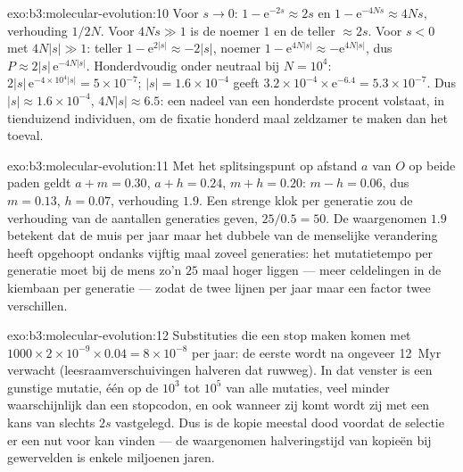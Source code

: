 \begin{solution}{exo:b3:molecular-evolution:10}
Voor $s \to 0$: $1 - \mathrm{e}^{-2s} \approx 2s$ en $1 - \mathrm{e}^{-4Ns}
\approx 4Ns$, verhouding $1/2N$. Voor $4Ns \gg 1$ is de noemer $1$ en de
teller $\approx 2s$. Voor $s < 0$ met $4N|s| \gg 1$: teller $1 -
\mathrm{e}^{2|s|} \approx -2|s|$, noemer $1 - \mathrm{e}^{4N|s|} \approx
-\mathrm{e}^{4N|s|}$, dus $P \approx 2|s|\,\mathrm{e}^{-4N|s|}$.
Honderdvoudig onder neutraal bij $N = 10^{4}$: $2|s|\,\mathrm{e}^{-4\times 10^{4}|s|} =
5\times 10^{-7}$; $|s| = 1.6\times 10^{-4}$ geeft $3.2\times 10^{-4}\times
\mathrm{e}^{-6.4} = 5.3\times 10^{-7}$. Dus $|s| \approx 1.6\times 10^{-4}$,
$4N|s| \approx 6.5$: een nadeel van een honderdste procent volstaat, in
tienduizend individuen, om de fixatie honderd maal zeldzamer te maken
dan het toeval.
\end{solution}

\begin{solution}{exo:b3:molecular-evolution:11}
Met het splitsingspunt op afstand $a$ van $O$ op beide paden geldt $a + m =
0.30$, $a + h = 0.24$, $m + h = 0.20$: $m - h = 0.06$, dus $m = 0.13$, $h
= 0.07$, verhouding $1.9$. Een strenge klok per generatie zou de
verhouding van de aantallen generaties geven, $25/0.5 = 50$. De
waargenomen $1.9$ betekent dat de muis per jaar maar het dubbele van de
menselijke verandering heeft opgehoopt ondanks vijftig maal zoveel
generaties: het mutatietempo per generatie moet bij de mens zo'n $25$
maal hoger liggen --- meer celdelingen in de kiembaan per generatie ---
zodat de twee lijnen per jaar maar een factor twee verschillen.
\end{solution}

\begin{solution}{exo:b3:molecular-evolution:12}
Substituties die een stop maken komen met $1000\times 2\times 10^{-9}\times
0.04 = 8\times 10^{-8}$ per jaar: de eerste wordt na ongeveer
\qty{12}{Myr} verwacht (leesraamverschuivingen halveren dat ruwweg). In
dat venster is een gunstige mutatie, één op de $10^{3}$ tot $10^{5}$ van
alle mutaties, veel minder waarschijnlijk dan een stopcodon, en ook
wanneer zij komt wordt zij met een kans van slechts $2s$ vastgelegd.
Dus is de kopie meestal dood voordat de selectie er een nut voor kan
vinden --- de waargenomen halveringstijd van kopieën bij gewervelden is
enkele miljoenen jaren.
\end{solution}


